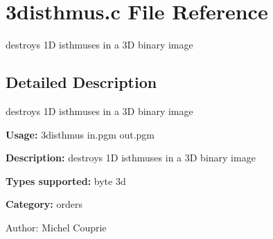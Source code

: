 \section{3disthmus.c File Reference}
\label{3disthmus_8c}
destroys 1D isthmuses in a 3D binary image  




\label{_details}
\subsection{Detailed Description}
destroys 1D isthmuses in a 3D binary image 

{\bf Usage:} 3disthmus in.pgm out.pgm

{\bf Description:} destroys 1D isthmuses in a 3D binary image

{\bf Types supported:} byte 3d

{\bf Category:} orders

\begin{Desc}
\item[Author:]Michel Couprie \end{Desc}
